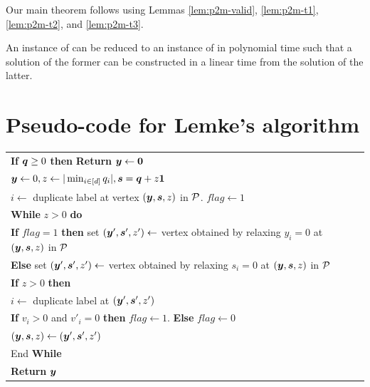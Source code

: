 Our main theorem follows using Lemmas \ref{lem:p2m-valid}, \ref{lem:p2m-t1}, \ref{lem:p2m-t2}, and \ref{lem:p2m-t3}.

\begin{theorem}\label{thm:p2m}
An instance of \EOPL can be reduced to an instance of \EOML in polynomial time such that a solution of the former can be constructed in a linear time from the solution of the latter. 
\end{theorem}

\section{Pseudo-code for Lemke's algorithm}
\label{app:lemke}

\begin{tabular}{|l|}
\hline
\hspace{5pt} {\bf If} $\mbox{\boldmath $q$}\ge 0$ {\bf then} {\bf Return} $\mbox{\boldmath $y$}\leftarrow \mbox{\boldmath $0$}$ \\
\hspace{5pt} $\mbox{\boldmath $y$}\leftarrow 0, z\leftarrow |\min_{i \in [d]} q_i|, \mbox{\boldmath $s$}=\mbox{\boldmath $q$}+z\mbox{\boldmath $1$}$\\
\hspace{5pt} $i\leftarrow $ duplicate label at vertex $(\mbox{\boldmath $y$},\mbox{\boldmath $s$},z)$ in $\mbox{${\mathcal P}$}$. $flag\leftarrow 1$ \\
\hspace{5pt} {\bf While} $z>0$ {\bf do}\\
\hspace{10pt} {\bf If} $flag=1$ {\bf then} set $(\mbox{\boldmath $y$}',\mbox{\boldmath $s$}',z')\leftarrow $ vertex obtained by relaxing $y_i=0$ at $(\mbox{\boldmath $y$},\mbox{\boldmath $s$},z)$ in $\mbox{${\mathcal P}$}$\\
\hspace{10pt} {\bf Else} set $(\mbox{\boldmath $y$}',\mbox{\boldmath $s$}',z')\leftarrow $ vertex obtained by relaxing $s_i=0$ at $(\mbox{\boldmath $y$},\mbox{\boldmath $s$},z)$ in $\mbox{${\mathcal P}$}$\\
\hspace{10pt} {\bf If} $z>0$ {\bf then}\\
\hspace{15pt} $i \leftarrow $ duplicate label at $(\mbox{\boldmath $y$}',\mbox{\boldmath $s$}',z')$\\
\hspace{15pt} {\bf If} $v_i>0$ and $v'_i=0$ {\bf then} $flag\leftarrow 1$. {\bf Else} $flag\leftarrow 0$\\
\hspace{15pt} $(\mbox{\boldmath $y$},\mbox{\boldmath $s$},z)\leftarrow(\mbox{\boldmath $y$}',\mbox{\boldmath $s$}',z')$\\
\hspace{5pt} End {\bf While} \\
\hspace{5pt} {\bf Return} $\mbox{\boldmath $y$}$\\
\hline
\end{tabular}


